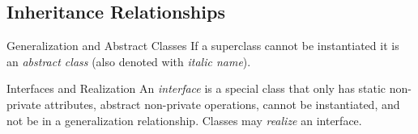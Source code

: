 
\subsection{Inheritance Relationships}
\begin{frame}{\insertsubsection}
	\begin{fancycolumns}[animation=none]
		\begin{definition}{Generalization and Abstract Classes}
			 If a superclass cannot be instantiated it is an \emph{abstract class} (also denoted with \textit{italic name}). \mysource{\umluserguide}
		\end{definition}
		\pause
		\begin{definition}{Interfaces and Realization}
			An \emph{interface} is a special class that only has static non-private attributes, abstract non-private operations, cannot be instantiated, and not be in a generalization relationship. Classes may \emph{realize} an interface. 
		\end{definition}
		\nextcolumn
	\end{fancycolumns}
\end{frame}

